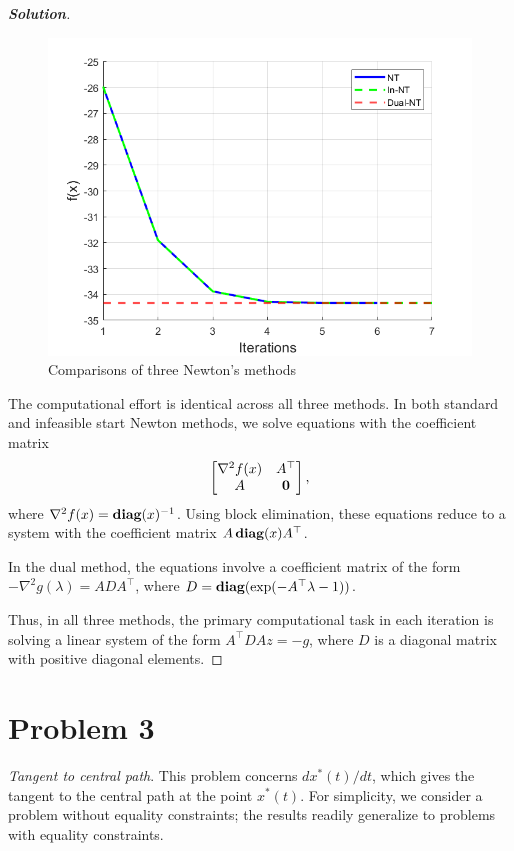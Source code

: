 \documentclass[11pt]{article}
\newenvironment{solution}
  {\renewcommand\qedsymbol{$\square$}\begin{proof}[\textbf{Solution}]}
  {\end{proof}}
\newcommand{\hess}{\nabla^2}
\begin{document}
\begin{solution}
    \begin{figure}[htb]
        \includegraphics[width=0.6\columnwidth]{"hw6p2.png"}
        \centering
        \caption{Comparisons of three Newton's methods}
        \label{fig:p2}
    \end{figure}


    The computational effort is identical across all three methods. In both standard and infeasible start Newton methods, we solve equations with the coefficient matrix 
    \[
        \begin{bmatrix}
            \hess f(x) & A^\top \\
            A & \zeros
        \end{bmatrix},
    \]
    where $\hess f(x) = \diag(x)^{-1}$.    
    Using block elimination, these equations reduce to a system with the coefficient matrix $A \mathop{\textbf{diag}}(x) A^\top$.
    
    In the dual method, the equations involve a coefficient matrix of the form $-\hess g(\lambda) = A D A^\top$, where $D = \mathop{\textbf{diag}}(\exp(-A^\top \lambda - 1))$.
    
    Thus, in all three methods, the primary computational task in each iteration is solving a linear system of the form $A^\top D A z = -g$, where $D$ is a diagonal matrix with positive diagonal elements.
    
\end{solution}




\clearpage
\section*{Problem 3}
\textit{Tangent to central path}. This problem concerns $dx^*(t)/dt$, which gives the tangent to the central path at the point $x^*(t)$. For simplicity, we consider a problem without equality constraints; the results readily generalize to problems with equality constraints.
\end{document}
